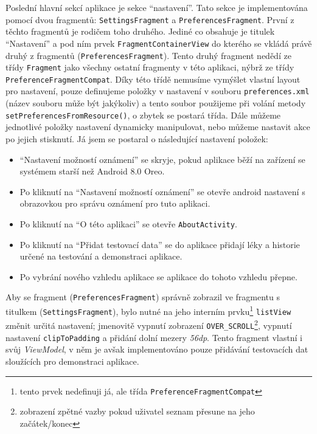 \documentclass[../TakeYourPill.tex]{subfiles}
\begin{document}
Poslední hlavní sekcí aplikace je sekce \enquote{nastavení}. Tato sekce je implementována pomocí dvou fragmentů: \texttt{SettingsFragment} a \texttt{PreferencesFragment}. První z těchto fragmentů je rodičem toho druhého. Jediné co obsahuje je titulek \enquote{Nastavení} a pod ním prvek \texttt{FragmentContainerView} do kterého se vkládá právě druhý z fragmentů (\texttt{PreferencesFragment}). Tento druhý fragment nedědí ze třídy \texttt{Fragment} jako všechny ostatní fragmenty v této aplikaci, nýbrž ze třídy \texttt{PreferenceFragmentCompat}. Díky této třídě nemusíme vymýšlet vlastní layout pro nastavení, pouze definujeme položky v nastavení v souboru \texttt{preferences.xml} (název souboru může být jakýkoliv) a tento soubor použijeme při volání metody \texttt{setPreferencesFromResource()}, o zbytek se postará třída. Dále můžeme jednotlivé položky nastavení dynamicky manipulovat, nebo můžeme nastavit akce po jejich stisknutí. Já jsem se postaral o následující nastavení položek:
\begin{itemize}
  \item \enquote{Nastavení možností oznámení} se skryje, pokud aplikace běží na zařízení se systémem starší než Android 8.0 Oreo.
  \item Po kliknutí na \enquote{Nastavení možností oznámení} se otevře android nastavení s obrazovkou pro správu oznámení pro tuto aplikaci.
  \item Po kliknutí na \enquote{O této aplikaci} se otevře \texttt{AboutActivity}.
  \item Po kliknutí na \enquote{Přidat testovací data} se do aplikace přidají léky a historie určené na testování a demonstraci aplikace.
  \item Po vybrání nového vzhledu aplikace se aplikace do tohoto vzhledu přepne.
\end{itemize}

Aby se fragment (\texttt{PreferencesFragment}) správně zobrazil ve fragmentu s titulkem (\texttt{SettingsFragment}), bylo nutné na jeho interním prvku\footnote{tento prvek nedefinuji já, ale třída \texttt{PreferenceFragmentCompat}} \texttt{listView} změnit určitá nastavení; jmenovitě vypnutí zobrazení \texttt{OVER\_SCROLL}\footnote{zobrazení zpětné vazby pokud uživatel seznam přesune na jeho začátek/konec}, vypnutí nastavení \texttt{clipToPadding} a přidání dolní mezery \textit{56dp}.
Tento fragment vlastní i svůj \textit{ViewModel}, v něm je avšak implementováno pouze přidávání testovacích dat sloužících pro demonstraci aplikace.
\end{document}
